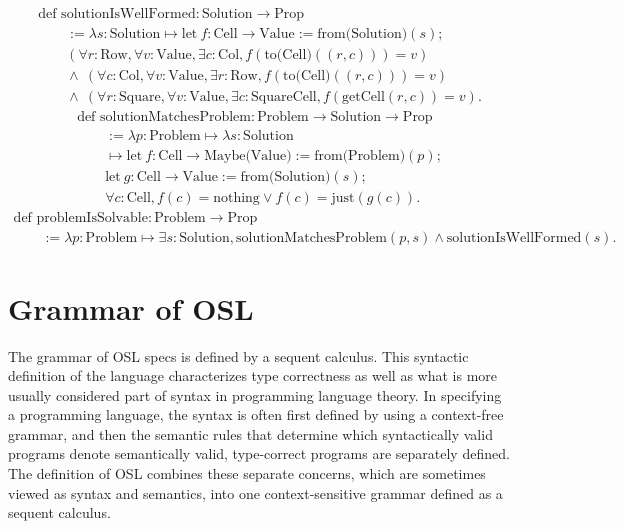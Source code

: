 \documentclass[11pt]{article}
\begin{document}
\begin{equation}
	\begin{array}{l}
		\text{def solutionIsWellFormed} : \text{Solution} \to \text{Prop} \\
		\qquad := \lambda s : \text{Solution} \mapsto
		\text{let}\ f : \text{Cell} \to \text{Value} := \text{from(Solution)}(s); \\
		\qquad (\forall r : \text{Row}, \forall v : \text{Value},
			\exists c : \text{Col}, f(\text{to(Cell)}((r, c))) = v) \\
		\qquad \wedge\ (\forall c : \text{Col}, \forall v : \text{Value},
			\exists r : \text{Row}, f(\text{to(Cell)}((r, c))) = v) \\
		\qquad \wedge\ (\forall r : \text{Square}, \forall v : \text{Value},
			\exists c : \text{SquareCell}, f(\text{getCell}(r, c)) = v).
	\end{array}
\end{equation}
\begin{equation}
	\begin{array}{l}
		\text{def solutionMatchesProblem} : \text{Problem} \to \text{Solution} \to \text{Prop} \\
		\qquad := \lambda p : \text{Problem} \mapsto \lambda s : \text{Solution} \\
		\qquad \mapsto \text{let}\ f : \text{Cell} \to \text{Maybe(Value)} := \text{from(Problem)}(p); \\
		\qquad \text{let}\ g : \text{Cell} \to \text{Value} := \text{from(Solution)}(s); \\
		\qquad \forall c : \text{Cell}, f(c) = \text{nothing} \vee f(c) = \text{just}(g(c)).
	\end{array}
\end{equation}
\begin{equation}
	\begin{array}{l}
		\text{def problemIsSolvable} : \text{Problem} \to \text{Prop} \\
		\qquad := \lambda p : \text{Problem} \mapsto
		\exists s : \text{Solution}, \text{solutionMatchesProblem}(p,s)
		\wedge \text{solutionIsWellFormed}(s).
	\end{array}
\end{equation}


\section{Grammar of OSL}
\label{sec:osl-grammar}

The grammar of OSL specs is defined by a sequent calculus.
This syntactic definition of the language characterizes type
correctness as well as what is more usually considered
part of syntax in programming language theory. In
specifying a programming language, the syntax is often first defined by using a context-free grammar, and then
the semantic rules that determine
which syntactically valid programs denote semantically
valid, type-correct programs are separately defined. The definition of OSL
combines these separate concerns, which are sometimes viewed
as syntax and semantics, into one context-sensitive grammar
defined as a sequent calculus.
\end{document}
